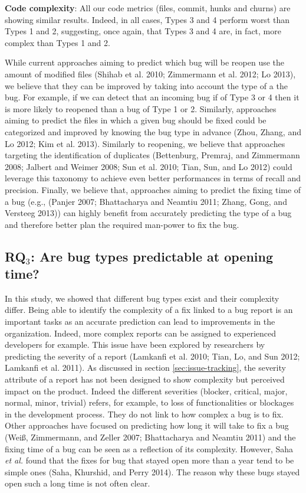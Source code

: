 \documentclass[natbib]{svjour3}
\begin{document}
\textbf{Code complexity}: All our code metrics (files, commit, hunks and
churns) are showing similar results. Indeed, in all cases, Types 3 and 4
perform worst than Types 1 and 2, suggesting, once again, that Types 3
and 4 are, in fact, more complex than Types 1 and 2.

While current approaches aiming to predict which bug will be reopen use
the amount of modified files (Shihab et al. 2010; Zimmermann et al.
2012; Lo 2013), we believe that they can be improved by taking into
account the type of a the bug. For example, if we can detect that an
incoming bug if of Type 3 or 4 then it is more likely to reopened than a
bug of Type 1 or 2. Similarly, approaches aiming to predict the files in
which a given bug should be fixed could be categorized and improved by
knowing the bug type in advance (Zhou, Zhang, and Lo 2012; Kim et al.
2013). Similarly to reopening, we believe that approaches targeting the
identification of duplicates (Bettenburg, Premraj, and Zimmermann 2008;
Jalbert and Weimer 2008; Sun et al. 2010; Tian, Sun, and Lo 2012) could
leverage this taxonomy to achieve even better performances in terms of
recall and precision. Finally, we believe that, approaches aiming to
predict the fixing time of a bug (e.g., (Panjer 2007; Bhattacharya and
Neamtiu 2011; Zhang, Gong, and Versteeg 2013)) can highly benefit from
accurately predicting the type of a bug and therefore better plan the
required man-power to fix the bug.

\subsection{\texorpdfstring{RQ\(_3\): Are bug types predictable at
opening
time?}{RQ\_3: Are bug types predictable at opening time?}}\label{rqux5f3-are-bug-types-predictable-at-opening-time}

In this study, we showed that different bug types exist and their
complexity differ. Being able to identify the complexity of a fix linked
to a bug report is an important tasks as an accurate prediction can lead
to improvements in the organization. Indeed, more complex reports can be
assigned to experienced developers for example. This issue have been
explored by researchers by predicting the severity of a report (Lamkanfi
et al. 2010; Tian, Lo, and Sun 2012; Lamkanfi et al. 2011). As discussed
in section \ref{sec:issue-tracking}, the severity attribute of a report
has not been designed to show complexity but perceived impact on the
product. Indeed the different severities (blocker, critical, major,
normal, minor, trivial) refers, for example, to loss of functionalities
or blockages in the development process. They do not link to how complex
a bug is to fix. Other approaches have focused on predicting how long it
will take to fix a bug (Weiß, Zimmermann, and Zeller 2007; Bhattacharya
and Neamtiu 2011) and the fixing time of a bug can be seen as a
reflection of its complexity. However, Saha \emph{et al.} found that the
fixes for bug that stayed open more than a year tend to be simple ones
(Saha, Khurshid, and Perry 2014). The reason why these bugs stayed open
such a long time is not often clear.
\end{document}
